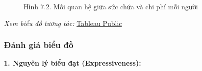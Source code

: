 \begin{figure}[H]
    \centering
    \caption{Hình 7.2. Mối quan hệ giữa sức chứa và chi phí mỗi người}
    \label{fig:domain-task7-chart2}
\end{figure}

\noindent\small\textit{Xem biểu đồ tương tác: }\href{https://public.tableau.com/app/profile/duy.le4605/viz/Group10_17788537028430/Task7_2-AccommodatesvsPriceperPerso?publish=yes}{Tableau Public}\normalsize

\subsubsection{Đánh giá biểu đồ}

\textbf{1. Nguyên lý biểu đạt (Expressiveness):}

